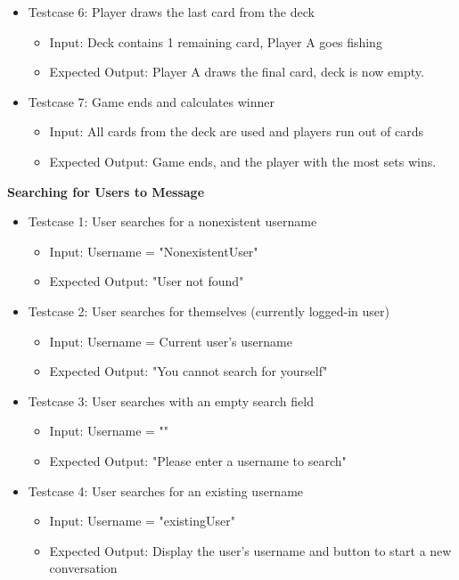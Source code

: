 \begin{itemize}
    \item Testcase 6: Player draws the last card from the deck
    \begin{itemize}
        \item Input: Deck contains 1 remaining card, Player A goes fishing
        \item Expected Output: Player A draws the final card, deck is now empty.
    \end{itemize}

    \item Testcase 7: Game ends and calculates winner
    \begin{itemize}
        \item Input: All cards from the deck are used and players run out of cards
        \item Expected Output: Game ends, and the player with the most sets wins.
    \end{itemize}
\end{itemize}

\noindent
\textbf{Searching for Users to Message}
\begin{itemize}
    \item Testcase 1: User searches for a nonexistent username
    \begin{itemize}
        \item Input: Username = "NonexistentUser"
        \item Expected Output: "User not found"
    \end{itemize}

    \item Testcase 2: User searches for themselves (currently logged-in user)
    \begin{itemize}
        \item Input: Username = Current user’s username
        \item Expected Output: "You cannot search for yourself"
    \end{itemize}

    \item Testcase 3: User searches with an empty search field
    \begin{itemize}
        \item Input: Username = ""
        \item Expected Output: "Please enter a username to search"
    \end{itemize}

    \item Testcase 4: User searches for an existing username
    \begin{itemize}
        \item Input: Username = "existingUser"
        \item Expected Output: Display the user’s username and button to start a new conversation
    \end{itemize}
\end{itemize}

